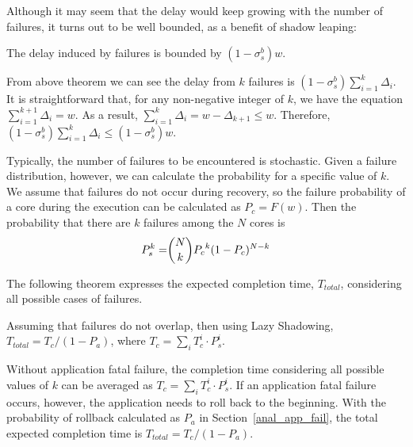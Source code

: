 Although it may seem that the delay would keep growing with the number of failures, 
it turns out to be well bounded, as a benefit of shadow leaping: 

\begin{corollary}
The delay induced by failures is bounded by $(1-\sigma_s^b)w$.
\end{corollary}
\begin{IEEEproof}
From above theorem we can see the delay from $k$ failures is $(1-\sigma_s^b)\sum_{i=1}^k\Delta_i$. It is straightforward that, for any non-negative integer of $k$, we have the equation $\sum_{i=1}^{k+1}\Delta_i= w$. As a result, 
$\sum_{i=1}^{k}\Delta_i = w - \Delta_{k+1} \le w$. Therefore, $(1-\sigma_s^b)\sum_{i=1}^k\Delta_i \le (1-\sigma_s^b)w$.
\end{IEEEproof}

Typically, the number of failures to be encountered is stochastic. Given a failure distribution, however, we can calculate the probability for a specific value of $k$. We assume that failures do not occur during recovery, so the failure probability of a core during the execution can be calculated as $P_c = F(w)$. Then the probability that there are $k$ failures among the $N$ cores is 
\begin{equation}
\begin{split}
P_s^{k}= & \dbinom{N}{k}{P_c}^k(1-P_c)^{N-k} \\
\end{split}
\end{equation}

The following theorem expresses the expected completion time, $T_{total}$, considering all possible cases of failures. 

\begin{theorem}
Assuming that failures do not overlap, then using Lazy Shadowing,
$T_{total} = T_{c} / (1 - P_a)$, where $T_{c} = \sum_{i} T_{c}^{i} \cdot P_s^{i}$.
\end{theorem}
\begin{IEEEproof}
Without application fatal failure, the completion time considering all possible values of $k$ can be averaged as $T_{c} = \sum_{i} T_{c}^{i} \cdot P_s^{i}$. If an application fatal failure occurs, however, the application needs to roll back to the beginning. With the probability of rollback calculated as $P_a$ in Section~\ref{anal_app_fail}, the total expected completion time is $T_{total} = T_{c} / (1 - P_a)$.
\end{IEEEproof}

